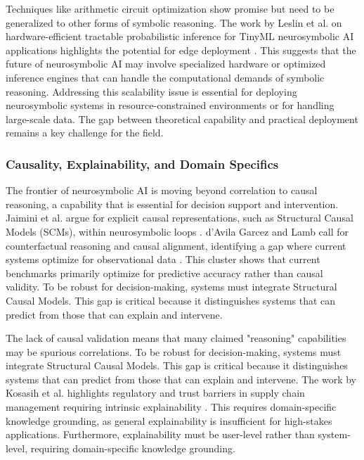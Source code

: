 \documentclass{article}
\begin{document}
Techniques like arithmetic circuit optimization show promise but need to be generalized to other forms of symbolic reasoning. The work by Leslin et al. on hardware-efficient tractable probabilistic inference for TinyML neurosymbolic AI applications highlights the potential for edge deployment \cite{leslin2025hardwareefficient}. This suggests that the future of neurosymbolic AI may involve specialized hardware or optimized inference engines that can handle the computational demands of symbolic reasoning. Addressing this scalability issue is essential for deploying neurosymbolic systems in resource-constrained environments or for handling large-scale data. The gap between theoretical capability and practical deployment remains a key challenge for the field.

\subsubsection{Causality, Explainability, and Domain Specifics}

\label{sec:causality_explainability_and_domain_spec}

The frontier of neurosymbolic AI is moving beyond correlation to causal reasoning, a capability that is essential for decision support and intervention. Jaimini et al. argue for explicit causal representations, such as Structural Causal Models (SCMs), within neurosymbolic loops \cite{jaimini2024causal}. d'Avila Garcez and Lamb call for counterfactual reasoning and causal alignment, identifying a gap where current systems optimize for observational data \cite{garcez2020neurosymbolic}. This cluster shows that current benchmarks primarily optimize for predictive accuracy rather than causal validity. To be robust for decision-making, systems must integrate Structural Causal Models. This gap is critical because it distinguishes systems that can predict from those that can explain and intervene.

The lack of causal validation means that many claimed "reasoning" capabilities may be spurious correlations. To be robust for decision-making, systems must integrate Structural Causal Models. This gap is critical because it distinguishes systems that can predict from those that can explain and intervene. The work by Kosasih et al. highlights regulatory and trust barriers in supply chain management requiring intrinsic explainability \cite{kosasih2023review}. This requires domain-specific knowledge grounding, as general explainability is insufficient for high-stakes applications. Furthermore, explainability must be user-level rather than system-level, requiring domain-specific knowledge grounding.
\end{document}
